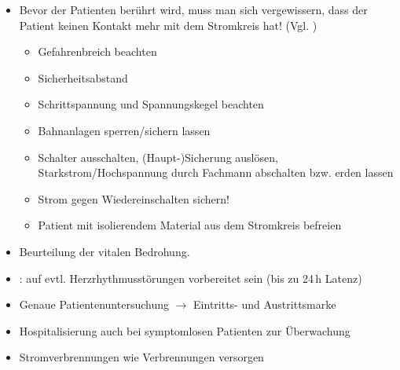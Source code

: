 {\label{m:stromunfall}}
{
\begin{itemize}
  \item {} Bevor der Patienten berührt wird,
  muss man sich vergewissern, dass der Patient
  keinen Kontakt mehr mit dem Stromkreis hat!  (Vgl. )
  \begin{itemize}
    \item Gefahrenbreich beachten
    \item Sicherheitsabstand
    \item Schrittspannung und Spannungskegel
    beachten 
    \item Bahnanlagen sperren/sichern lassen
    \item Schalter ausschalten, (Haupt-)Sicherung
    auslösen, Starkstrom/Hochspannung durch Fachmann  abschalten bzw.
    erden lassen
    \item Strom gegen Wiedereinschalten sichern!
    \item Patient mit isolierendem Material aus dem Stromkreis befreien
  \end{itemize}
  \item Beurteilung der vitalen Bedrohung.
  \par \TxBeiVit
  \TxMassVitMK
  \item {}: auf evtl.
  Herzrhythmusstörungen vorbereitet sein
  (bis zu 24\,h Latenz)
  \item Genaue Patientenuntersuchung ${\rightarrow}$
  Eintritts- und Austrittsmarke
  \item Hospitalisierung auch bei symptomlosen
  Patienten zur Überwachung
  \item Stromverbrennungen wie Verbrennungen versorgen
\end{itemize}
}
